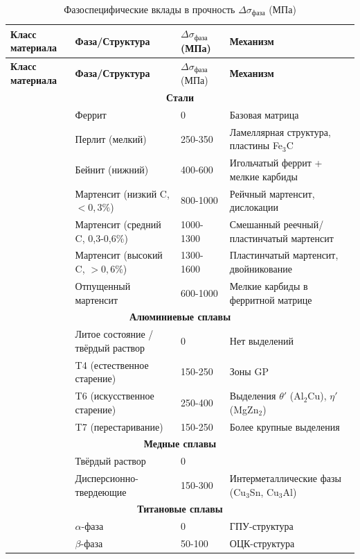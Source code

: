 \documentclass[12pt,a4paper]{article}
\begin{document}
	\begin{longtable}{p{3.5cm}p{3.0cm}p{3.0cm}p{4cm}}
		\caption{Фазоспецифические вклады в прочность \(\Delta\sigma_{\text{фаза}}\) (МПа)} \label{tab:phase-contributions} \\
		\toprule
		\textbf{Класс материала} & \textbf{Фаза/Структура} & \(\Delta\sigma_{\text{фаза}}\) (МПа) & \textbf{Механизм} \\
		\midrule
		\endfirsthead
		\toprule
		\textbf{Класс материала} & \textbf{Фаза/Структура} & \(\Delta\sigma_{\text{фаза}}\) (МПа) & \textbf{Механизм} \\
		\midrule
		\endhead
		\multicolumn{4}{c}{\textbf{Стали}} \\
		& Феррит & 0 & Базовая матрица \\
		& Перлит (мелкий) & 250-350 & Ламеллярная структура, пластины Fe\(_3\)C \\
		& Бейнит (нижний) & 400-600 & Игольчатый феррит + мелкие карбиды \\
		& Мартенсит (низкий C, \(<0,3\%\)) & 800-1000 & Рейчный мартенсит, дислокации \\
		& Мартенсит (средний C, 0,3-0,6\%) & 1000-1300 & Смешанный реечный/пластинчатый мартенсит \\
		& Мартенсит (высокий C, \(>0,6\%\)) & 1300-1600 & Пластинчатый мартенсит, двойникование \\
		& Отпущенный мартенсит & 600-1000 & Мелкие карбиды в ферритной матрице \\
		\hline
		\multicolumn{4}{c}{\textbf{Алюминиевые сплавы}} \\
		& Литое состояние / твёрдый раствор & 0 & Нет выделений \\
		& T4 (естественное старение) & 150-250 & Зоны GP \\
		& T6 (искусственное старение) & 250-400 & Выделения \(\theta'\) (Al\(_2\)Cu), \(\eta'\) (MgZn\(_2\)) \\
		& T7 (перестаривание) & 150-250 & Более крупные выделения \\
		\hline
		\multicolumn{4}{c}{\textbf{Медные сплавы}} \\
		& Твёрдый раствор & 0 & \\
		& Дисперсионно-твердеющие & 150-300 & Интерметаллические фазы (Cu\(_3\)Sn, Cu\(_3\)Al) \\
		\hline
		\multicolumn{4}{c}{\textbf{Титановые сплавы}} \\
		& \(\alpha\)-фаза & 0 & ГПУ-структура \\
		& \(\beta\)-фаза & 50-100 & ОЦК-структура \\

\end{longtable}
\end{document}
